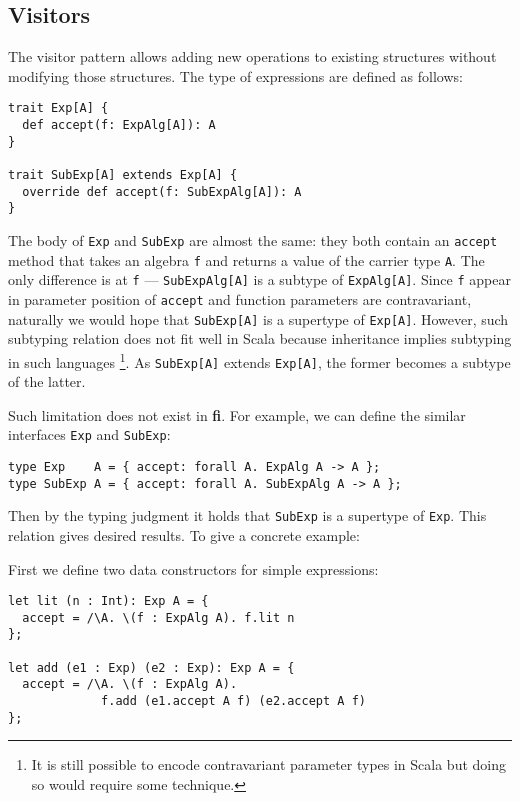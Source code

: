 \documentclass[preprint]{sigplanconf}
\newcommand{\systemFI}{{\bf fi}}
\begin{document}
\subsection{Visitors}

The visitor pattern allows adding new operations to existing structures without
modifying those structures. The type of expressions are defined as follows:

\begin{verbatim}
trait Exp[A] {
  def accept(f: ExpAlg[A]): A
}

trait SubExp[A] extends Exp[A] {
  override def accept(f: SubExpAlg[A]): A
}
\end{verbatim}

The body of \lstinline{Exp} and \lstinline{SubExp} are almost the same: they
both contain an \lstinline{accept} method that takes an algebra \lstinline{f}
and returns a value of the carrier type \lstinline{A}. The only difference is at
\lstinline{f} --- \lstinline{SubExpAlg[A]} is a subtype of
\lstinline{ExpAlg[A]}. Since \lstinline{f} appear in parameter position of
\lstinline{accept} and function parameters are contravariant, naturally we would
hope that \lstinline{SubExp[A]} is a supertype of \lstinline{Exp[A]}. However,
such subtyping relation does not fit well in Scala because inheritance implies
subtyping in such languages \footnote{It is still possible to encode
  contravariant parameter types in Scala but doing so would require some
  technique.}. As \lstinline{SubExp[A]} extends \lstinline{Exp[A]}, the former
becomes a subtype of the latter.

Such limitation does not exist in \systemFI. For example, we can define the similar interfaces \lstinline{Exp} and \lstinline{SubExp}:
\begin{verbatim}
type Exp    A = { accept: forall A. ExpAlg A -> A };
type SubExp A = { accept: forall A. SubExpAlg A -> A };
\end{verbatim}
Then by the typing judgment it holds that \lstinline{SubExp} is a supertype of
\lstinline{Exp}. This relation gives desired results. To give a concrete example:

First we define two data constructors for simple expressions:
\begin{verbatim}
let lit (n : Int): Exp A = {
  accept = /\A. \(f : ExpAlg A). f.lit n
};

let add (e1 : Exp) (e2 : Exp): Exp A = {
  accept = /\A. \(f : ExpAlg A).
             f.add (e1.accept A f) (e2.accept A f)
};
\end{verbatim}
\end{document}
